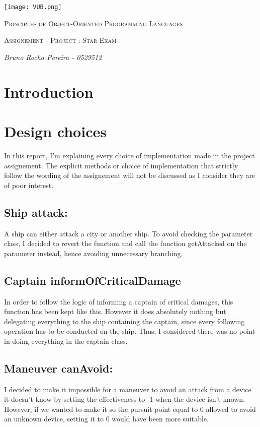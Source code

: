 \documentclass[12pt,a4paper]{scrartcl}
\begin{document}
\begin{titlepage}
    \centering
    \texttt{[image: VUB.png]}\par\vspace{1cm}
    {\scshape\Large Principles of Object-Oriented Programming Languages\par}
    \vspace{1cm}
    {\scshape\Large Assignement - Project : Star Exam\par}
    \vspace{1.5cm}
    {\Large\itshape Bruno Rocha Pereira - 0529512\par}
    \vfill
\end{titlepage}
\section{Introduction}
\section{Design choices}
In this report, I'm explaining every choice of implementation made in the project assignement. The explicit methods or choice of implementation that strictly follow the wording of the assignement will not be discussed as I consider they are of poor interest.

\subsection{Ship attack:}
A ship can either attack a city or another ship. To avoid checking the parameter class,  I decided to revert the function and call the function getAttacked on the parameter instead, hence avoiding unnecessary branching.

\subsection{Captain informOfCriticalDamage}
In order to follow the logic of informing a captain of critical damages, this function has been kept like this. However it does absolutely nothing but delegating everything to the ship containing the captain, since every following operation has to be conducted on the ship. Thus, I considered there was no point in doing everything in the captain class.

\subsection{Maneuver canAvoid:}
I decided to make it impossible for a maneuver to avoid an attack from a device it doesn't know by setting the effectiveness to -1 when the device isn't known. However, if we wanted to make it so the pursuit point equal to 0 allowed to avoid an unknown device, setting it to 0 would have been more suitable.
\end{document}
